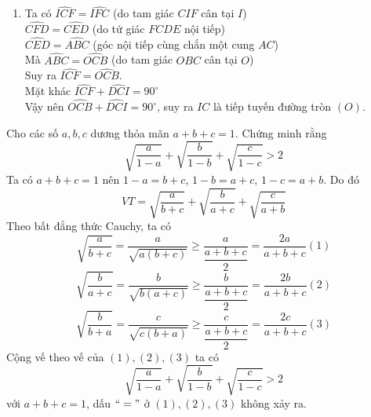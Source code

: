 \begin{ex}
{\begin{enumerate}
 Từ đó suy ra $\dfrac{DA}{DB}=\dfrac{DC}{DE}\Rightarrow DA.DE=DB.DC$.
        \item Ta có
          $\widehat{ICF}=\widehat{IFC}$ (do tam giác $CIF$ cân tại $I$)\\
          $\widehat{CFD}=\widehat{CED}$ (do tứ giác $FCDE$ nội tiếp)\\
       $ \widehat{CED}=\widehat{ABC}$ (góc nội tiếp cùng chắn một cung $AC$)\\
       Mà  $\widehat{ABC}=\widehat{OCB}$ (do tam giác $OBC$ cân tại $O$)\\
        Suy ra  $\widehat{ICF}=\widehat{OCB}$.\\
        Mặt khác  $\widehat{ICF}+\widehat{DCI}=90^{\circ}$\\
        Vậy nên   $\widehat{OCB}+\widehat{DCI}=90^{\circ}$, 
        suy ra $IC$ là tiếp tuyến đường tròn $(O)$. 
    \end{enumerate}
    }
\end{ex}

\begin{ex}%
    Cho các số $a, b, c$ dương thỏa mãn $a+b+c=1$. Chứng minh rằng
    $$\sqrt{\dfrac{a}{1-a}}+\sqrt{\dfrac{b}{1-b}}+\sqrt{\dfrac{c}{1-c}}>2$$
\loigiai
    {
   Ta có $a+b+c=1$ nên $1-a=b+c$, $1-b=a+c$, $1-c=a+b$. Do đó\\
   $$VT=\sqrt{\dfrac{a}{b+c}}+\sqrt{\dfrac{b}{a+c}}+\sqrt{\dfrac{c}{a+b}}$$
   Theo bất đẳng thức Cauchy, ta có
    $$\sqrt{\dfrac{a}{b+c}}=\dfrac{a}{\sqrt{a(b+c)}} \ge \dfrac{a}{\dfrac{a+b+c}{2}}=\dfrac{2a}{a+b+c}     (1)$$
   $$\sqrt{\dfrac{b}{a+c}}=\dfrac{b}{\sqrt{b(a+c)}} \ge \dfrac{b}{\dfrac{a+b+c}{2}}=\dfrac{2b}{a+b+c}     (2)$$
   $$\sqrt{\dfrac{b}{b+a}}=\dfrac{c}{\sqrt{c(b+a)}} \ge \dfrac{c}{\dfrac{a+b+c}{2}}=\dfrac{2c}{a+b+c}       (3)$$
   Cộng vế theo vế của $(1),(2),(3)$ ta có 
   $$\sqrt{\dfrac{a}{1-a}}+\sqrt{\dfrac{b}{1-b}}+\sqrt{\dfrac{c}{1-c}}>2$$
   với $a+b+c=1$, dấu $ ``="$  ở  $(1), (2), (3) $  không xảy ra.
    }
\end{ex}

